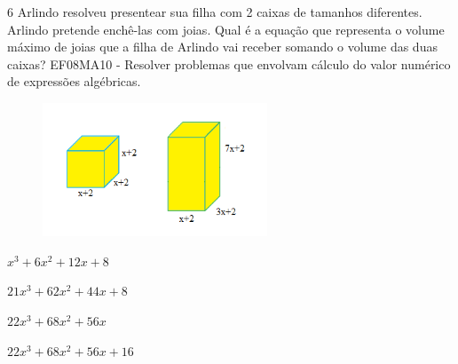 
\num{6} Arlindo resolveu presentear sua filha com 2 caixas de tamanhos
diferentes. Arlindo pretende enchê-las com joias. Qual é a equação que
representa o volume máximo de joias que a filha de Arlindo vai receber
somando o volume das duas caixas? EF08MA10 - Resolver problemas que
envolvam cálculo do valor numérico de expressões algébricas.

\begin{figure}[H]
\centering\includegraphics[width=2.63333in,height=1.56545in]{./imgSAEB_8_MAT/media/image55.png}
\end{figure}

\begin{escolha}
\item $x^3 + 6x^2 + 12x + 8$
\item $21x^3 + 62x^2 + 44x + 8$
\item $22x^3 + 68x^2+ 56x$
\item $22x^3 + 68x^2 + 56x + 16$
\end{escolha}









